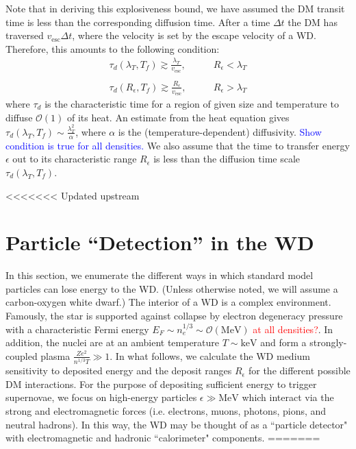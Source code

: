 \documentclass[twocolumn,showpacs,preprintnumbers,amsmath,amssymb,prl]{revtex4}
\newcommand{\OO}{\mathcal{O}}
\begin{document}
Note that in deriving this explosiveness bound, we have assumed the DM transit time is less than the corresponding diffusion time. After a time $\Delta t$ the DM has traversed $v_{\text{esc}} \Delta t$, where the velocity is set by the escape velocity of a WD. Therefore, this amounts to the following condition:
\begin{equation}
\begin{array}{ll}
             \tau_d(\lambda_T, T_f) \gtrsim \frac{\lambda_T}{v_{\text{esc}}}, & \quad \quad R_\epsilon < \lambda_T \\ \\
            \tau_d(R_\epsilon, T_f)  \gtrsim \frac{R_\epsilon}{v_{\text{esc}}},  & \quad \quad R_\epsilon > \lambda_T
        \end{array}
\end{equation}
where $\tau_d$ is the characteristic time for a region of given size and temperature to diffuse $\OO(1)$ of its heat. An estimate from the heat equation gives $\tau_d(\lambda_T, T_f) \sim \frac{\lambda_T^2}{\alpha}$, where $\alpha$ is the (temperature-dependent) diffusivity. \textcolor{blue}{Show condition is true for all densities.} We also assume that the time to transfer energy $\epsilon$ out to its characteristic range $R_\epsilon$ is less than the diffusion time scale $\tau_d(\lambda_T, T_f)$.

<<<<<<< Updated upstream
\section{Particle ``Detection'' in the WD}
In this section, we enumerate the different ways in which standard model particles can lose energy to the WD. (Unless otherwise noted, we will assume a carbon-oxygen white dwarf.) The interior of a WD is a complex environment. Famously, the star is supported against collapse by electron degeneracy pressure with a characteristic Fermi energy $E_F \sim n_e^{1/3} \sim \OO(\text{MeV})$ \textcolor{red}{at all densities?}. In addition, the nuclei are at an ambient temperature $T \sim \text{keV}$ and form a strongly-coupled plasma $\frac{Z e^2}{n^{1/3} T} \gg 1$. In what follows, we calculate the WD medium sensitivity to deposited energy and the deposit ranges $R_\epsilon$ for the different possible DM interactions. For the purpose of depositing sufficient energy to trigger supernovae, we focus on high-energy particles $\epsilon \gg \text{MeV}$ which interact via the strong and electromagnetic forces (i.e. electrons, muons, photons, pions, and neutral hadrons). In this way, the WD may be thought of as a ``particle detector" with electromagnetic and hadronic ``calorimeter" components.
=======
\end{document}
